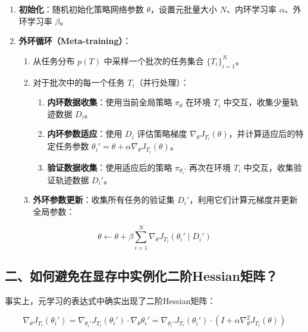 \begin{enumerate}
\def\labelenumi{\arabic{enumi}.}
\tightlist
\item
  \textbf{初始化}：随机初始化策略网络参数 \(\theta\)，设置元批量大小 \(N\)、内环学习率 \(\alpha\)、外环学习率 \(\beta\)。
\item
  \textbf{外环循环（Meta-training）}：

  \begin{enumerate}
  \def\labelenumii{\arabic{enumii}.}
  \tightlist
  \item
    从任务分布 \(p(T)\) 中采样一个批次的任务集合 \(\{T_i\}_{i=1}^N\)。
  \item
    对于批次中的每一个任务 \(T_i\)（并行处理）：

    \begin{enumerate}
    \def\labelenumiii{\arabic{enumiii}.}
    \tightlist
    \item
      \textbf{内环数据收集}：使用当前全局策略 \(\pi_\theta\) 在环境 \(T_i\) 中交互，收集少量轨迹数据 \(D_i\)。
    \item
      \textbf{内环参数适应}：使用 \(D_i\) 评估策略梯度 \(\nabla_\theta J_{T_i}(\theta)\)，并计算适应后的特定任务参数 \(\theta_i' = \theta + \alpha \nabla_\theta J_{T_i}(\theta)\)。
    \item
      \textbf{验证数据收集}：使用适应后的策略 \(\pi_{\theta_i'}\) 再次在环境 \(T_i\) 中交互，收集验证轨迹数据 \(D_i'\)。
    \end{enumerate}
  \item
    \textbf{外环参数更新}：收集所有任务的验证集 \(D_i'\)，利用它们计算元梯度并更新全局参数：
  \end{enumerate}
\end{enumerate}

\[
\theta \leftarrow \theta + \beta \sum_{i=1}^{N} \nabla_\theta J_{T_i}(\theta_i' \mid D_i')
\]

\hypertarget{ux4e8cux5982ux4f55ux907fux514dux5728ux663eux5b58ux4e2dux5b9eux4f8bux5316ux4e8cux9636hessianux77e9ux9635}{%
\subsection{二、如何避免在显存中实例化二阶Hessian矩阵？}\label{ux4e8cux5982ux4f55ux907fux514dux5728ux663eux5b58ux4e2dux5b9eux4f8bux5316ux4e8cux9636hessianux77e9ux9635}}

事实上，元学习的表达式中确实出现了二阶Hessian矩阵：

\[
\nabla_\theta J_{T_i}(\theta_i')
= \nabla_{\theta_i'} J_{T_i}(\theta_i') \cdot \nabla_\theta \theta_i'
= \nabla_{\theta_i'} J_{T_i}(\theta_i') \cdot
\left(I + \alpha \nabla_\theta^2 J_{T_i}(\theta)\right)
\]

